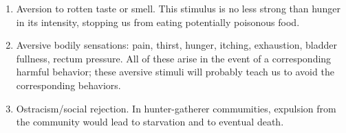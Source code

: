\documentclass[11pt]{article}
\theoremstyle{remark}
\theoremstyle{definition}
\begin{document}
\begin{enumerate}





\item Aversion to rotten taste or smell. This stimulus is no less strong than hunger in its intensity, stopping us from eating potentially poisonous food. 

\item Aversive bodily sensations: pain, thirst, hunger, itching, exhaustion, bladder fullness, rectum pressure. All of these arise in the event of a corresponding harmful behavior; these aversive stimuli will probably teach us to avoid the corresponding behaviors.

\item Ostracism/social rejection. In hunter-gatherer commumities, expulsion from the community would lead to starvation and to eventual death.






\end{enumerate}







\end{document}
